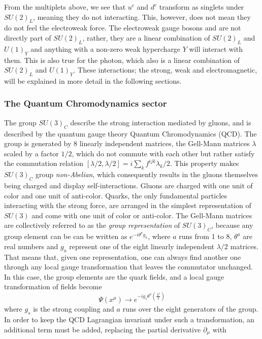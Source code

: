 From the multiplets above, we see that $u^c$ and $d^c$ transform as singlets under $SU(2)_L$, meaning they do not interacting. This, however, does not mean they do not feel the electroweak force. The electroweak gauge bosons \PW and \PZ are not directly part of $SU(2)_L$, rather, they are a linear combination of $SU(2)_L$ and $U(1)_Y$ and anything with a non-zero weak hypercharge $Y$ will interact with them. This is also true for the photon, which also is a linear combination of $SU(2)_L$ and $U(1)_Y$.\newline
These interactions; the strong, weak and electromagnetic, will be explained in more detail in the following sections.

\subsubsection{The Quantum Chromodynamics sector}
\label{sec:theory:qcd}
The group $SU(3)_C$ describe the strong interaction mediated by gluons, and is described by the quantum gauge theory Quantum Chromodynamics (QCD). The group is generated by 8 linearly independent matrices, the Gell-Mann matrices $\lambda$~\cite{PhysRev.125.1067} scaled by a factor $1/2$, which do not commute with each other but rather satisfy the commutation relation $[\lambda/2,\lambda/2]=i \sum_k f^{ijk} \lambda_k/2$. This property makes $SU(3)_C$ group \emph{non-Abelian}, which consequently results in the gluons themselves being charged and display self-interactions. Gluons are charged with one unit of color and one unit of anti-color. Quarks, the only fundamental particles interacting with the strong force, are arranged in the simplest representation of $SU(3)$ and come with one unit of color or anti-color. \newline
The Gell-Mann matrices are collectively referred to as the \emph{group representation} of $SU(3)_C$, because any group element can be can be written as $e^{-i\theta^a g_a}$, where $a$ runs from 1 to 8, $\theta^a$ are real numbers and $g_a$ represent one of the eight linearly independent $\lambda/2$ matrices. That means that, given one representation, one can always find another one through any local gauge transformation that leaves the commutator unchanged.  
In this case, the group elements are the quark fields, and a local gauge transformation of fields become
\begin{equation}
  \Psi(x^{\mu}) \rightarrow e^{ -i g_s \theta^a (\frac{\lambda^a}{2})}
\end{equation}
where $g_s$ is the strong coupling and $a$ runs over the eight generators of the group. In order to keep the QCD Lagrangian invariant under such a transformation, an additional term must be added, replacing the partial derivative $\partial_{\mu}$ with
